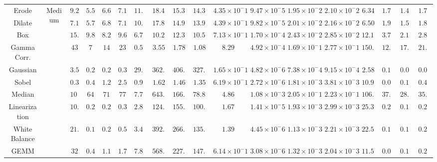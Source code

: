 \begin{landscape}
\begin{table}
{\begin{tabular}{c|c|c|c|c|c|c|c|c|c|c|c|c|c|c|c|c|c}
\cmidrule{1-1}\cline{2-2}\cmidrule{3-18}
Erode & \multirow{13}{*}{Medium} & $9.2$ & $5.5$ & $6.6$ & $7.1$ & $11.04$ & $18.47$ & $15.39$ & $14.31$ & $4.35 \times 10^-1$ & $9.47 \times 10^-5$ & $1.95 \times 10^-2$ & $2.10 \times 10^-2$ & $6.34$ & $1.79$ & $1.49$ & $1.75$ \\ 
\cmidrule{1-1}\cmidrule{3-18}
Dilate &  & $7.1$ & $5.7$ & $6.8$ & $7.1$ & $10.92$ & $17.82$ & $14.94$ & $13.91$ & $4.39 \times 10^-1$ & $9.82 \times 10^-5$ & $2.01 \times 10^-2$ & $2.16 \times 10^-2$ & $6.50$ & $1.91$ & $1.54$ & $1.87$ \\ 
\cmidrule{1-1}\cmidrule{3-18}
Box &  & $15.1$ & $9.88$ & $8.23$ & $9.65$ & $6.73$ & $10.28$ & $12.35$ & $10.53$ & $7.13 \times 10^-1$ & $1.70 \times 10^-4$ & $2.43 \times 10^-2$ & $2.85 \times 10^-2$ & $12.19$ & $3.70$ & $2.19$ & $2.85$ \\ 
\cmidrule{1-1}\cmidrule{3-18}
Gamma Corr. &  & $43$ & $7$ & $14$ & $23$ & $0.58$ & $3.55$ & $1.78$ & $1.08$ & $8.29$ & $4.92 \times 10^-4$ & $1.69 \times 10^-1$ & $2.77 \times 10^-1$ & $150.34$ & $12.66$ & $17.44$ & $21.26$ \\ 
\cmidrule{1-1}\cmidrule{3-18}
Gaussian &  & $3.5$ & $0.28$ & $0.25$ & $0.31$ & $29.03$ & $362.88$ & $406.43$ & $327.76$ & $1.65 \times 10^-1$ & $4.82 \times 10^-6$ & $7.38 \times 10^-4$ & $9.15 \times 10^-4$ & $2.58$ & $0.10$ & $0.06$ & $0.08$ \\ 
\cmidrule{1-1}\cmidrule{3-18}
Sobel &  & $0.31$ & $0.41$ & $1.2$ & $2.53$ & $0.99$ & $1.62$ & $1.46$ & $1.35$ & $6.19 \times 10^-1$ & $2.72 \times 10^-6$ & $1.81 \times 10^-3$ & $3.81 \times 10^-3$ & $10.96$ & $0.07$ & $0.19$ & $0.42$ \\ 
\cmidrule{1-1}\cmidrule{3-18}
Median &  & $105$ & $64$ & $71$ & $77$ & $7.76$ & $643.20$ & $166.16$ & $78.81$ & $4.86$ & $1.08 \times 10^-3$ & $2.05 \times 10^-1$ & $2.23 \times 10^-1$ & $106.34$ & $37.65$ & $28.76$ & $35.65$ \\ 
\cmidrule{1-1}\cmidrule{3-18}
Linearization &  & $10.8$ & $0.25$ & $0.20$ & $0.31$ & $2.88$ & $124.42$ & $155.52$ & $100.34$ & $1.67$ & $1.41 \times 10^-5$ & $1.93 \times 10^-3$ & $2.99 \times 10^-3$ & $25.35$ & $0.28$ & $0.15$ & $0.26$ \\ 
\cmidrule{1-1}\cmidrule{3-18}
White Balance &  & $21.6$ & $0.19$ & $0.28$ & $0.55$ & $3.46$ & $392.89$ & $266.61$ & $135.73$ & $1.39$ & $4.45 \times 10^-6$ & $1.13 \times 10^-3$ & $2.21 \times 10^-3$ & $22.57$ & $0.10$ & $0.11$ & $0.23$ \\ 
\cmidrule{1-1}\cmidrule{3-18}
GEMM &  & $32$ & $0.44$ & $1.1$ & $1.7$ & $7.81$ & $568.18$ & $227.27$ & $147.06$ & $6.14 \times 10^-1$ & $3.08 \times 10^-6$ & $1.32 \times 10^-3$ & $2.04 \times 10^-3$ & $11.52$ & $0.09$ & $0.11$ & $0.20$ \\ 

\end{tabular}}
\end{table}
\end{landscape}
